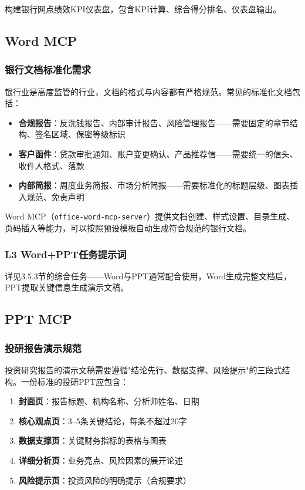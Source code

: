 构建银行网点绩效KPI仪表盘，包含KPI计算、综合得分排名、仪表盘输出。

\subsection{Word MCP}

\subsubsection{银行文档标准化需求}

银行业是高度监管的行业，文档的格式与内容都有严格规范。常见的标准化文档包括：

\begin{itemize}[leftmargin=2em]
  \item \textbf{合规报告}：反洗钱报告、内部审计报告、风险管理报告——需要固定的章节结构、签名区域、保密等级标识
  \item \textbf{客户函件}：贷款审批通知、账户变更确认、产品推荐信——需要统一的信头、收件人格式、落款
  \item \textbf{内部简报}：周度业务简报、市场分析简报——需要标准化的标题层级、图表插入规范、免责声明
\end{itemize}

Word MCP（\texttt{office-word-mcp-server}）提供文档创建、样式设置、目录生成、页码插入等能力，可以按照预设模板自动生成符合规范的银行文档。

\subsubsection{L3 Word+PPT任务提示词}

详见3.5.3节的综合任务——Word与PPT通常配合使用，Word生成完整文档后，PPT提取关键信息生成演示文稿。

\subsection{PPT MCP}

\subsubsection{投研报告演示规范}

投资研究报告的演示文稿需要遵循"结论先行、数据支撑、风险提示"的三段式结构。一份标准的投研PPT应包含：

\begin{enumerate}[leftmargin=2em]
  \item \textbf{封面页}：报告标题、机构名称、分析师姓名、日期
  \item \textbf{核心观点页}：3--5条关键结论，每条不超过20字
  \item \textbf{数据支撑页}：关键财务指标的表格与图表
  \item \textbf{详细分析页}：业务亮点、风险因素的展开论述
  \item \textbf{风险提示页}：投资风险的明确提示（合规要求）
\end{enumerate}

